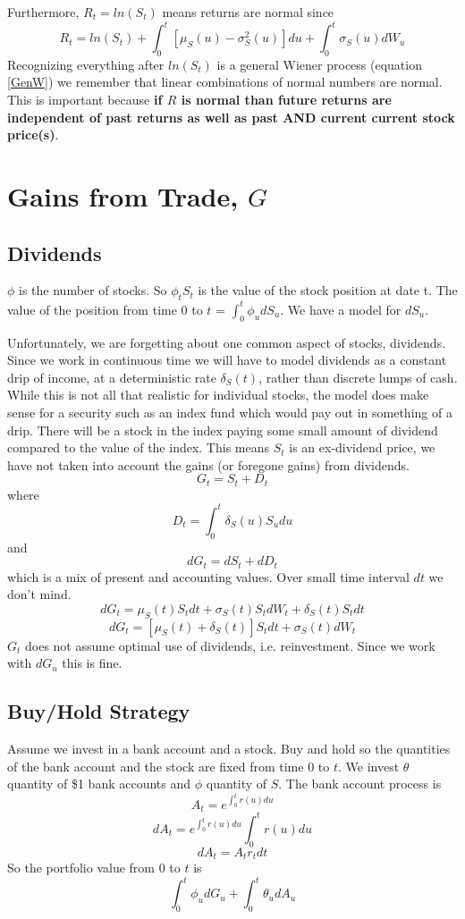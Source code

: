 \documentclass[12pt]{article}
\begin{document}
Furthermore, $R_t=ln(S_t)$ means returns are normal since
$$R_t=ln(S_t)+\int_0^t \left[ \mu_S(u)-\sigma_S^2(u) \right] du +
\int_0^t \sigma_S(u)dW_u$$
Recognizing everything after $ln(S_t)$ is a general Wiener process (equation
\ref{GenW}) we remember that linear combinations of normal numbers are normal.
This is important because
\textbf{if $R$ is normal than future returns are independent of past returns
  as well as past AND current current stock price(s)}.

\pagebreak

\section{Gains from Trade, $G$}

\subsection{Dividends}

$\phi$ is the number of stocks. So $\phi_t S_t$ is the value of the stock
position at date t. The value of the position from time $0$ to $t$ =
$\int_0^t \phi_u dS_u$. We have a model for $dS_u$.

Unfortunately, we are forgetting about one common aspect of stocks, dividends.
Since we work in continuous time we will have to model dividends as a
constant drip of income, at a deterministic rate $\delta_S(t)$,  rather than
discrete lumps of cash. While this is not all that realistic for individual
stocks, the model does make sense for a security such as an index fund which
would pay out in something of a drip. There will be a stock in the index
paying some small amount of dividend compared to the value of the index. This
means $S_t$ is an ex-dividend price, we have not taken into account the gains
(or foregone gains) from dividends.
$$G_t=S_t+D_t$$
where
$$D_t=\int_0^t \delta_S(u)S_udu$$
and
$$dG_t=dS_t+dD_t$$
which is a mix of present and accounting values. Over small time interval
$dt$ we don't mind.
$$dG_t=\mu_S(t)S_tdt+\sigma_S(t)S_tdW_t+\delta_S(t)S_tdt$$
$$dG_t=\left[ \mu_S(t)+\delta_S(t) \right] S_tdt+\sigma_S(t)dW_t$$
$G_t$ does not assume optimal use of dividends, i.e. reinvestment. Since we
work with $dG_u$ this is fine.

\subsection{Buy/Hold Strategy}

Assume we invest in a bank account and a stock. Buy and hold so the quantities
of the bank account and the stock are fixed from time $0$ to $t$. We invest
$\theta$ quantity of \$1 bank accounts and $\phi$ quantity of $S$. The bank
account process is
$$A_t=e^{\int_0^t r(u)du}$$
$$dA_t=e^{\int_0^t r(u)du} \int_0^t r(u)du$$
$$dA_t=A_tr_tdt$$
So the portfolio value from $0$ to $t$ is
$$\int_0^t \phi_u dG_u + \int_0^t \theta_udA_u$$
\end{document}
